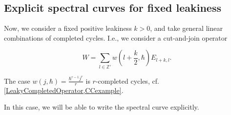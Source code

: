 \documentclass[10pt,a4paper,oneside,no-math,reqno]{amsart}%
\theoremstyle{plain}
\newtheorem{corollary}[theorem]{Corollary}
\theoremstyle{definition}
\theoremstyle{remark}
\numberwithin{equation}{section}
\renewcommand{\phi}{\varphi}
\newcommand{\mb}[1]{\mathbb{#1}}
\newcommand{\mc}[1]{\mathcal{#1}}
\newcommand{\1}{\mathds{1}}
\newcommand{\Z}{\mb{Z}}
\newcommand{\<}{\langle}
\renewcommand{\>}{\rangle}
\newcommand{\del}{\partial}
\DeclareMathOperator{\ad}{ad}
\begin{document}
	



\subsection{Explicit spectral curves for fixed leakiness}
\label{CurvesForFixedk}

Now, we consider a fixed positive leakiness $k > 0$, and take general linear combinations of  completed cycles. I.e., we consider a cut-and-join operator

\begin{equation}\label{CJ}
	W = \sum_{l \in \Z'} w (l + \frac{k}{2}, \hbar) E_{l + k,l}.
\end{equation}

The case $ w(j, \hbar) = \frac{\hbar^{r-1} j^r}{r} $ is $r$-completed cycles, cf. \cref{LeakyCompletedOperator,CCexample}.

In this case, we will be able to write the spectral curve explicitly.



\end{document}
